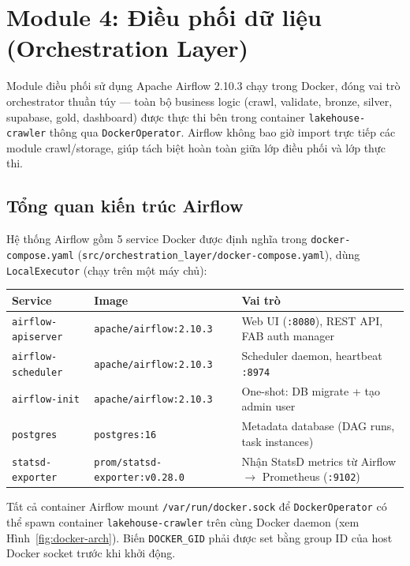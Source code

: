 
\section{Module 4: Điều phối dữ liệu (Orchestration Layer)}
\label{sec:orchestration}

Module điều phối sử dụng Apache Airflow 2.10.3 chạy trong Docker, đóng vai trò
orchestrator thuần túy --- toàn bộ business logic (crawl, validate, bronze, silver,
supabase, gold, dashboard) được thực thi bên trong container \texttt{lakehouse-crawler}
thông qua \texttt{DockerOperator}. Airflow không bao giờ import trực tiếp các module
crawl/storage, giúp tách biệt hoàn toàn giữa lớp điều phối và lớp thực thi.

\subsection{Tổng quan kiến trúc Airflow}
\label{subsec:airflow-arch}

Hệ thống Airflow gồm 5 service Docker được định nghĩa trong
\texttt{docker-compose.yaml} (\texttt{src/orchestration\_layer/docker-compose.yaml}),
dùng \texttt{LocalExecutor} (chạy trên một máy chủ):

\begin{longtable}{p{4.2cm} p{3cm} p{7cm}}
\toprule
\textbf{Service} & \textbf{Image} & \textbf{Vai trò} \\
\midrule
\endhead
\texttt{airflow-apiserver} & \texttt{apache/airflow:2.10.3} & Web UI (\texttt{:8080}), REST API, FAB auth manager \\
\texttt{airflow-scheduler} & \texttt{apache/airflow:2.10.3} & Scheduler daemon, heartbeat \texttt{:8974} \\
\texttt{airflow-init} & \texttt{apache/airflow:2.10.3} & One-shot: DB migrate + tạo admin user \\
\texttt{postgres} & \texttt{postgres:16} & Metadata database (DAG runs, task instances) \\
\texttt{statsd-exporter} & \texttt{prom/statsd-exporter:v0.28.0} & Nhận StatsD metrics từ Airflow $\to$ Prometheus (\texttt{:9102}) \\
\bottomrule
\end{longtable}

Tất cả container Airflow mount \texttt{/var/run/docker.sock} để \texttt{DockerOperator}
có thể spawn container \texttt{lakehouse-crawler} trên cùng Docker daemon (xem
Hình~\ref{fig:docker-arch}). Biến \texttt{DOCKER\_GID} phải được set bằng group ID
của host Docker socket trước khi khởi động.

